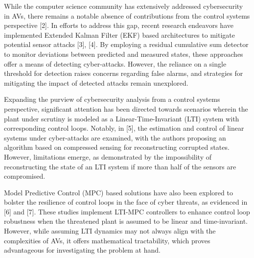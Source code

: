 While the computer science community has extensively addressed cybersecurity in AVs, there remains a notable absence of contributions from the control systems perspective [2]. In efforts to address this gap, recent research endeavors have implemented Extended Kalman Filter (EKF) based architectures to mitigate potential sensor attacks [3], [4]. By employing a residual cumulative sum detector to monitor deviations between predicted and measured states, these approaches offer a means of detecting cyber-attacks. However, the reliance on a single threshold for detection raises concerns regarding false alarms, and strategies for mitigating the impact of detected attacks remain unexplored.

Expanding the purview of cybersecurity analysis from a control systems perspective, significant attention has been directed towards scenarios wherein the plant under scrutiny is modeled as a Linear-Time-Invariant (LTI) system with corresponding control loops. Notably, in [5], the estimation and control of linear systems under cyber-attacks are examined, with the authors proposing an algorithm based on compressed sensing for reconstructing corrupted states. However, limitations emerge, as demonstrated by the impossibility of reconstructing the state of an LTI system if more than half of the sensors are compromised.

Model Predictive Control (MPC) based solutions have also been explored to bolster the resilience of control loops in the face of cyber threats, as evidenced in [6] and [7]. These studies implement LTI-MPC controllers to enhance control loop robustness when the threatened plant is assumed to be linear and time-invariant. However, while assuming LTI dynamics may not always align with the complexities of AVs, it offers mathematical tractability, which proves advantageous for investigating the problem at hand.